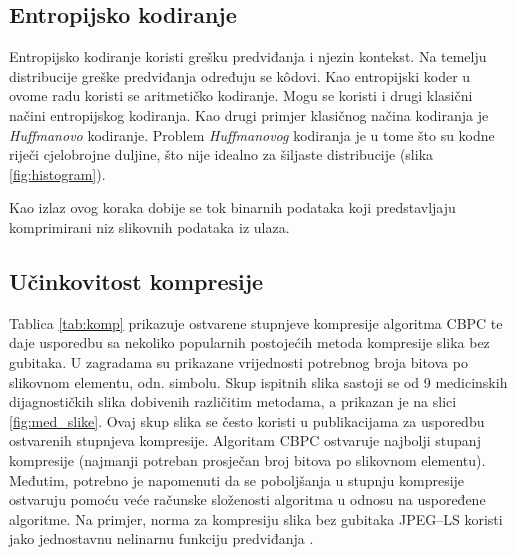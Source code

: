 \documentclass[times, utf8, zavrsni, numeric, sort]{fer}
\begin{document}
\subsection{Entropijsko kodiranje}
Entropijsko kodiranje koristi grešku predviđanja i njezin kontekst. Na temelju distribucije greške predviđanja određuju se k\^{o}dovi. Kao entropijski koder u ovome radu koristi se aritmetičko kodiranje. Mogu se koristi i drugi klasični načini entropijskog kodiranja. Kao drugi primjer klasičnog načina kodiranja je \emph{Huffmanovo} kodiranje. Problem \emph{Huffmanovog} kodiranja je u tome što su kodne riječi cjelobrojne duljine, što nije idealno za šiljaste distribucije (slika \ref{fig:histogram}).

Kao izlaz ovog koraka dobije se tok binarnih podataka koji predstavljaju komprimirani niz slikovnih podataka iz ulaza.

\subsection{Učinkovitost kompresije}
Tablica \ref{tab:komp} prikazuje ostvarene stupnjeve kompresije algoritma CBPC te daje usporedbu sa nekoliko popularnih postojećih metoda kompresije slika bez gubitaka. U zagradama su prikazane vrijednosti potrebnog broja bitova po slikovnom elementu, odn. simbolu. Skup ispitnih slika sastoji se od 9 medicinskih dijagnostičkih slika dobivenih različitim metodama, a prikazan je na slici \ref{fig:med_slike}. Ovaj skup slika se često koristi u publikacijama za usporedbu ostvarenih stupnjeva kompresije. Algoritam CBPC ostvaruje najbolji stupanj kompresije (najmanji potreban prosječan broj bitova po slikovnom elementu). Međutim, potrebno je napomenuti da se poboljšanja u stupnju kompresije ostvaruju pomoću veće računske složenosti algoritma u odnosu na uspoređene algoritme. Na primjer, norma za kompresiju slika bez gubitaka JPEG--LS koristi jako jednostavnu nelinarnu funkciju predviđanja \cite{Weinberger:98}.
\end{document}
